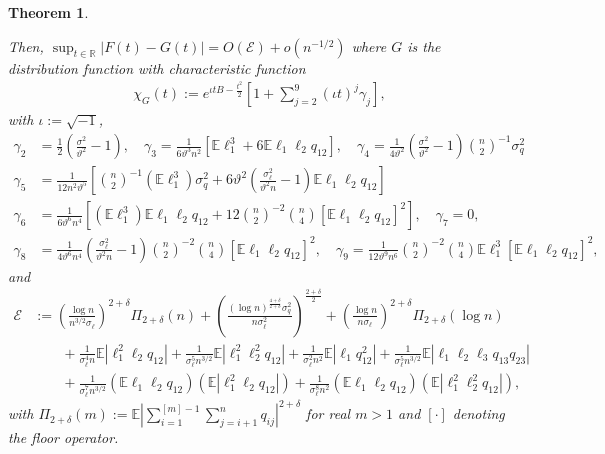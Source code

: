 \documentclass[11pt]{article}
\newtheorem{thm}{Theorem}
\numberwithin{equation}{section}
\theoremstyle{definition}
\newcommand{\E}{\mathbb{E}}
\newcommand{\R}{\mathbb{R}}
\newcommand{\Scale}{\vartheta}
\begin{document}
\begin{thm}
\begin{enumerate}[(a)]
    \end{enumerate}
    Then, $\sup_{t\in\R}\left|F(t) - G(t)\right|=O(\mathcal{E})+ o(n^{-1/2})$ where $G$ is the distribution function with characteristic function
\begin{align*}
\chi_{G}(t):= e^{\iota tB-\tfrac{t^2}{2}}\left[ 1 + \sum_{j=2}^9 \left(\iota t\right)^j\gamma_j \right],
\end{align*}
with $\iota := \sqrt{-1}$,
\begin{align*}
    \gamma_2&=\tfrac{1}{2}\left(\tfrac{\sigma^2}{\Scale^2}-1\right),\quad \gamma_3= \tfrac{1}{6\Scale^3n^2}\left[\E \ell_1^3 + 6\E\ell_1\ell_2q_{12} \right],\quad \gamma_4 = \tfrac{1}{4\Scale^2}\left(\tfrac{\sigma^2}
{\Scale^2}-1\right)\binom{n}{2}^{-1} \sigma_q^2\\
    \gamma_5 &= \tfrac{1}{12 n^2\Scale^5}\left[\binom{n}{2}^{-1}(\E\ell_1^3 )\sigma_q^2 + 6\Scale^2\left(\tfrac{\sigma_\ell^2}{\Scale^2 n}-1\right)\E\ell_1\ell_2q_{12}\right] \\
    \gamma_6 &= \tfrac{1}{6\Scale^6n^4}\left[(\E\ell_1^3)\E\ell_1\ell_2q_{12} + 12\binom{n}{2}^{-2}\binom{n}{4} \left[\E\ell_1\ell_2q_{12}\right]^ 2\right],\quad \gamma_7=0,\\
\gamma_8 &=\tfrac{1}{4\Scale^6n^4}\left(\tfrac{\sigma_\ell^2}{\Scale^2 n}-1\right)\binom{n}{2}^{-2}\binom{n}{4} \left[\E\ell_1\ell_2q_{12}\right]^2, \quad
\gamma_9 = \tfrac{1}{12\Scale^9n^6}\binom{n}{2}^{-2}\binom{n}{4} \E\ell_1^3\left[\E\ell_1\ell_2q_{12}\right]^ 2,
\end{align*}
    and
    \begin{align*}
    \mathcal{E} &:=\left(\tfrac{\log n}{ n^{3/2}\sigma_\ell}\right)^{2+\delta}\Pi_{2+\delta}(n) +\left(\tfrac{(\log n)^{\frac{4+\delta}{2+\delta}}\sigma_q^2}{n\sigma_\ell^2}\right)^{\tfrac{2+\delta}{2}}+\left(\tfrac{\log n}{n\sigma_\ell}\right)^{2+\delta}\Pi_{2+\delta}(\log n)\\
    &\qquad + \tfrac{1}{\sigma_\ell^4 n }\E|\ell_1^2\ell_2q_{12}| + \tfrac{1}{\sigma_\ell^5n^{3/2}}\E|\ell_1^2\ell_2^2q_{12}| + \tfrac{1}{\sigma_\ell^2 n^2}\E|\ell_1 q_{12}^2| + \tfrac{1}{\sigma_\ell^5 n^{3/2}}\E |\ell_1\ell_2\ell_3q_{13}q_{23}| \\ &\qquad + \tfrac{1}{\sigma_\ell^7n^{3/2}}(\E\ell_1\ell_2q_{12})(\E|\ell_1^2\ell_2q_{12}|)+ \tfrac{1}{\sigma_\ell^8n^2}(\E\ell_1\ell_2q_{12})(\E|\ell_1^2\ell_2^2q_{12}|),
    \end{align*}
    with $\Pi_{2+\delta}(m) :=\E|\sum_{i=1}^{[m]-1}\sum_{j=i+1}^n q_{ij}|^{2+\delta}$ for real $m>1$ and $[\cdot]$ denoting the floor operator.
\end{thm}
\end{document}
